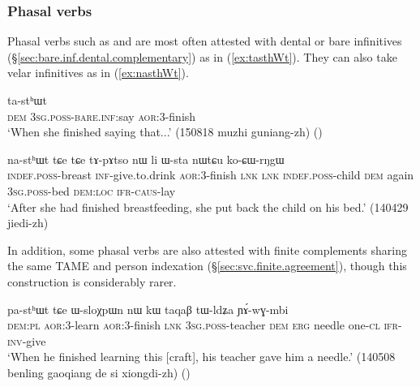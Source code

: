 \subsubsection{Phasal verbs} \label{sec:phasal.complements}

Phasal verbs such as   and   are most often attested with dental or bare infinitives (§\ref{sec:bare.inf.dental.complementary}) as in (\ref{ex:tasthWt}).  They can also take  velar infinitives as in (\ref{ex:nasthWt}).

\begin{exe}
\ex \label{ex:tasthWt}
\gll [nɯ ɯ-ti] ta-stʰɯt  \\
\textsc{dem} \textsc{3sg}.\textsc{poss}-\textsc{bare}.\textsc{inf}:say \textsc{aor}:3\flobv{}-finish \\
\glt `When she finished saying that...' (150818 muzhi guniang-zh)
()
\end{exe}
 

\begin{exe}
\ex \label{ex:nasthWt}
\gll [tɯ-nɯ kɤ-jtsʰi] na-stʰɯt tɕe tɕe tɤ-pɤtso nɯ li ɯ-sta nɯtɕu ko-ɕɯ-rŋgɯ	\\
\textsc{indef}.\textsc{poss}-breast \textsc{inf}-give.to.drink \textsc{aor}:3\flobv{}-finish \textsc{lnk} \textsc{lnk} \textsc{indef}.\textsc{poss}-child \textsc{dem} again \textsc{3sg}.\textsc{poss}-bed \textsc{dem}:\textsc{loc} \textsc{ifr}-\textsc{caus}-lay \\
\glt `After she had finished breastfeeding, she put back the child on his bed.' (140429 jiedi-zh)
\end{exe}

In addition, some phasal verbs are also attested with finite complements sharing the same TAME and person indexation (§\ref{sec:svc.finite.agreement}), though this construction is considerably rarer.

\begin{exe}
\ex \label{ex:pasthWt}
 pa-stʰɯt tɕe ɯ-sloχpɯn nɯ kɯ taqaβ tɯ-ldʑa ɲɤ́-wɣ-mbi \\
 \textsc{dem}:\textsc{pl} \textsc{aor}:3\flobv{}-learn \textsc{aor}:3\flobv{}-finish \textsc{lnk} \textsc{3sg}.\textsc{poss}-teacher \textsc{dem} \textsc{erg} needle one-\textsc{cl} \textsc{ifr}-\textsc{inv}-give  \\
\glt `When he finished learning this [craft], his teacher gave him a needle.' (140508 benling gaoqiang de si xiongdi-zh)
()
\end{exe} 

